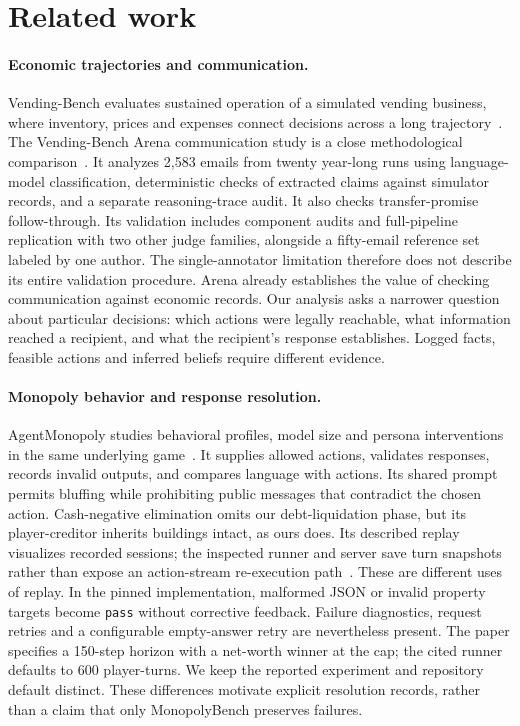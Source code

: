 \section{Related work}
\label{sec:related}

\paragraph{Economic trajectories and communication.}
Vending-Bench evaluates sustained operation of a simulated vending business, where inventory, prices and expenses connect decisions across a long trajectory~\cite{backlund2025vendingbench}. The Vending-Bench Arena communication study is a close methodological comparison~\cite{li2026arena}. It analyzes 2,583 emails from twenty year-long runs using language-model classification, deterministic checks of extracted claims against simulator records, and a separate reasoning-trace audit. It also checks transfer-promise follow-through. Its validation includes component audits and full-pipeline replication with two other judge families, alongside a fifty-email reference set labeled by one author. The single-annotator limitation therefore does not describe its entire validation procedure. Arena already establishes the value of checking communication against economic records. Our analysis asks a narrower question about particular decisions: which actions were legally reachable, what information reached a recipient, and what the recipient's response establishes. Logged facts, feasible actions and inferred beliefs require different evidence.

\paragraph{Monopoly behavior and response resolution.}
AgentMonopoly studies behavioral profiles, model size and persona interventions in the same underlying game~\cite{wu2026agentmonopoly}. It supplies allowed actions, validates responses, records invalid outputs, and compares language with actions. Its shared prompt permits bluffing while prohibiting public messages that contradict the chosen action. Cash-negative elimination omits our debt-liquidation phase, but its player-creditor inherits buildings intact, as ours does. Its described replay visualizes recorded sessions; the inspected runner and server save turn snapshots rather than expose an action-stream re-execution path~\cite{agentmonopoly2026repo}. These are different uses of replay. In the pinned implementation, malformed JSON or invalid property targets become \texttt{pass} without corrective feedback. Failure diagnostics, request retries and a configurable empty-answer retry are nevertheless present. The paper specifies a 150-step horizon with a net-worth winner at the cap; the cited runner defaults to 600 player-turns. We keep the reported experiment and repository default distinct. These differences motivate explicit resolution records, rather than a claim that only MonopolyBench preserves failures.

